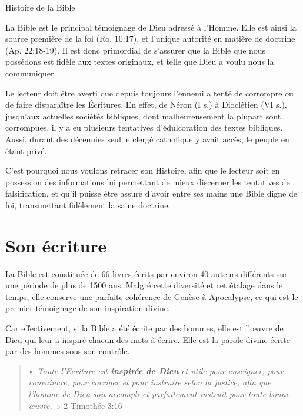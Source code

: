 \begin{center}{\LARGE Histoire de la Bible}\end{center}
\begin{small}

La Bible est le principal témoignage de Dieu adressé à l'Homme. Elle est ainsi la source première de la foi (Ro. 10:17), et l'unique autorité en matière de doctrine (Ap. 22:18-19). Il est donc primordial de s'assurer que la Bible que nous possédons est fidèle aux textes originaux, et telle que Dieu a voulu nous la communiquer.\bigskip

Le lecteur doit être averti que depuis toujours l'ennemi a tenté de corrompre ou de faire disparaître les Écritures. En effet, de Néron (I s.) à Dioclétien (VI s.), jusqu'aux actuelles sociétés bibliques, dont malheureusement la plupart sont corrompues, il y a eu plusieurs tentatives d'édulcoration des textes bibliques. Aussi, durant des décennies seul le clergé catholique y avait accès, le peuple en étant privé.\bigskip

C'est pourquoi nous voulons retracer son Histoire, afin que le lecteur soit en possession des informations lui permettant de mieux discerner les tentatives de falsification, et qu'il puisse être assuré d'avoir entre ses mains une Bible digne de foi, transmettant fidèlement la saine doctrine.

\section*{Son écriture}

La Bible est constituée de 66 livres écrits par environ 40 auteurs différents sur une période de plus de 1500 ans. Malgré cette diversité et cet étalage dans le temps, elle conserve une parfaite cohérence de Genèse à Apocalypse, ce qui est le premier témoignage de son inspiration divine.\bigskip

Car effectivement, si la Bible a été écrite par des hommes, elle est l'œuvre de Dieu qui leur a inspiré chacun des mots à écrire. Elle est la parole divine écrite par des hommes sous son contrôle.

\begin{quote}
«~\emph{Toute l'Ecriture est \textbf{inspirée de Dieu} et utile pour enseigner, pour convaincre, pour corriger et pour instruire selon la justice, afin que l'homme de Dieu soit accompli et parfaitement instruit pour toute bonne œuvre.}~» 2 Timothée 3:16
\end{quote}


\end{small}
